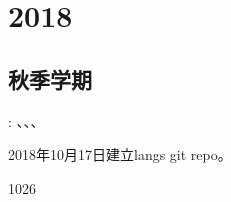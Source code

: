 \section{2018}
\label{sec:g2018}
\subsection{秋季学期}
\label{sec:g2018f}
: \ZY、\ZhangYX、\RenZH、\TangLT

2018年10月17日建立langs git repo。


{1026}


